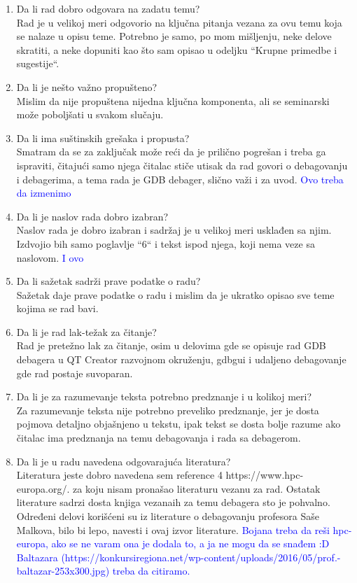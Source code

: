 \documentclass[a4paper]{report}
\newcommand{\odgovor}[1]{\textcolor{blue}{#1}}
\begin{document}
\begin{enumerate}
\item Da li rad dobro odgovara na zadatu temu?\\
Rad je u velikoj meri odgovorio na ključna pitanja vezana za ovu temu koja se nalaze u opisu teme. Potrebno je samo, po mom mišljenju, neke delove skratiti, a neke dopuniti kao što sam opisao u odeljku ``Krupne primedbe i sugestije``.

\item Da li je nešto važno propušteno?\\
Mislim da nije propuštena nijedna ključna komponenta, ali se seminarski može poboljšati u svakom slučaju.

\item Da li ima suštinskih grešaka i propusta?\\
Smatram da se za zaključak može reći da je prilično pogrešan i treba ga ispraviti, čitajući samo njega čitalac stiče utisak da rad govori o debagovanju i debagerima,
a tema rada je GDB debager, slično važi i za uvod.
\odgovor{Ovo treba da izmenimo}

\item Da li je naslov rada dobro izabran?\\
Naslov rada je dobro izabran i sadržaj je u velikoj meri usklađen sa njim. Izdvojio bih samo poglavlje ``6`` i tekst ispod njega, koji nema veze sa naslovom.
\odgovor{I ovo}

\item Da li sažetak sadrži prave podatke o radu?\\
Sažetak daje prave podatke o radu i mislim da je ukratko opisao sve teme kojima se rad bavi.

\item Da li je rad lak-težak za čitanje?\\
Rad je pretežno lak za čitanje, osim u delovima gde se opisuje rad GDB debagera u QT Creator razvojnom okruženju, gdbgui i udaljeno debagovanje gde rad postaje suvoparan.

\item Da li je za razumevanje teksta potrebno predznanje i u kolikoj meri?\\
Za razumevanje teksta nije potrebno preveliko predznanje, jer je dosta pojmova detaljno objašnjeno u tekstu, ipak tekst se dosta bolje razume ako čitalac ima predznanja na temu debagovanja i rada sa debagerom. 

\item Da li je u radu navedena odgovarajuća literatura?\\
Literatura jeste dobro navedena sem reference 4 https://www.hpc-europa.org/. za koju nisam pronašao literaturu vezanu za rad. 
Ostatak literature sadrzi dosta knjiga vezanaih za temu debagera sto je pohvalno. Određeni delovi korišćeni su iz literature o 
debagovanju profesora Saše Malkova, bilo bi lepo, navesti i ovaj izvor literature.
\odgovor{Bojana treba da reši hpc-europa, ako se ne varam ona je dodala to, a ja ne mogu da se snađem :D Baltazara (https://konkursiregiona.net/wp-content/uploads/2016/05/prof.-baltazar-253x300.jpg)
treba da citiramo.}


\end{enumerate}
\end{document}
